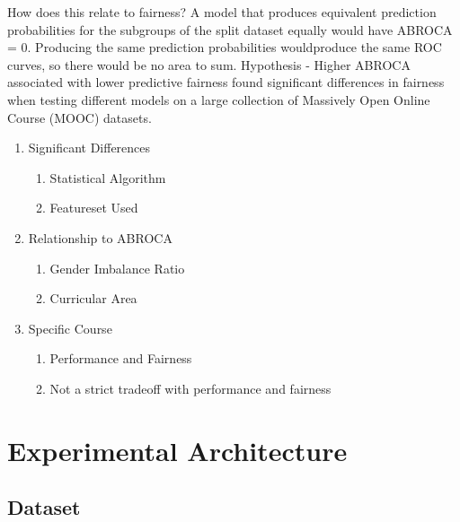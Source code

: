 \documentclass{article}
\begin{document}
                How does this relate to fairness?
                A model that produces equivalent prediction probabilities for the subgroups of the split dataset equally would have ABROCA = 0. 
                Producing the same prediction probabilities wouldproduce the same ROC curves, so there would be no area to sum.
                Hypothesis - Higher ABROCA associated with lower predictive fairness
                \cite{eval2019} found significant differences in fairness when testing different models on a large collection of Massively Open Online Course (MOOC) datasets.
                \begin{enumerate}
                    \item Significant Differences
                    \begin{enumerate}
                        \item Statistical Algorithm
                        \item Featureset Used
                    \end{enumerate}
                    \item Relationship to ABROCA
                    \begin{enumerate}
                        \item Gender Imbalance Ratio
                        \item Curricular Area
                    \end{enumerate}
                    \item Specific Course
                    \begin{enumerate}
                        \item Performance and Fairness
                        \item Not a strict tradeoff with performance and fairness
                    \end{enumerate}
                \end{enumerate}
    
\section{Experimental Architecture}
    \subsection{Dataset}
\end{document}
